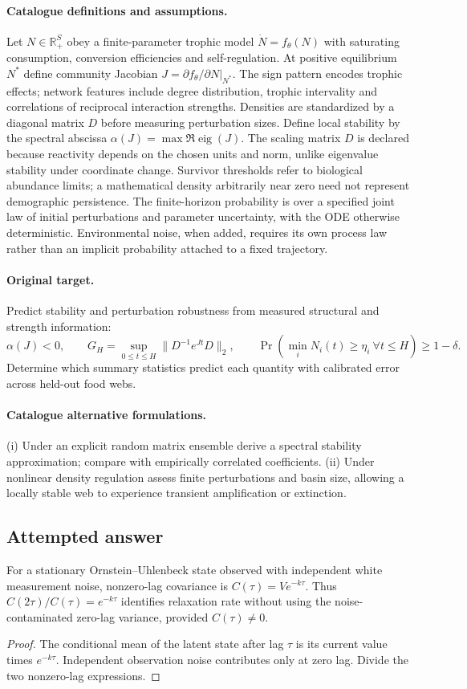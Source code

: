 \documentclass[11pt]{article}
\begin{document}
\paragraph{Catalogue definitions and assumptions.}
Let $N\in\mathbb{R}_+^S$ obey a finite-parameter trophic model $\dot N=f_\theta(N)$ with saturating consumption, conversion efficiencies and self-regulation. At positive equilibrium $N^*$ define community Jacobian $J=\partial f_\theta/\partial N|_{N^*}$. The sign pattern encodes trophic effects; network features include degree distribution, trophic intervality and correlations of reciprocal interaction strengths. Densities are standardized by a diagonal matrix $D$ before measuring perturbation sizes. Define local stability by the spectral abscissa $\alpha(J)=\max\Re\operatorname{eig}(J)$. The scaling matrix $D$ is declared because reactivity depends on the chosen units and norm, unlike eigenvalue stability under coordinate change. Survivor thresholds refer to biological abundance limits; a mathematical density arbitrarily near zero need not represent demographic persistence. The finite-horizon probability is over a specified joint law of initial perturbations and parameter uncertainty, with the ODE otherwise deterministic. Environmental noise, when added, requires its own process law rather than an implicit probability attached to a fixed trajectory.
\paragraph{Original target.}
Predict stability and perturbation robustness from measured structural and strength information:
\[
 \alpha(J)<0,\qquad
 G_H=\sup_{0\le t\le H}\|D^{-1}e^{Jt}D\|_2,
 \qquad \Pr(\min_iN_i(t)\ge\eta_i\ \forall t\le H)\ge1-\delta.
\]
Determine which summary statistics predict each quantity with calibrated error across held-out food webs.
\paragraph{Catalogue alternative formulations.}
(i) Under an explicit random matrix ensemble derive a spectral stability approximation; compare with empirically correlated coefficients. (ii) Under nonlinear density regulation assess finite perturbations and basin size, allowing a locally stable web to experience transient amplification or extinction.
\subsection{Attempted answer}
\begin{proposition}
For a stationary Ornstein--Uhlenbeck state observed with independent white measurement noise, nonzero-lag covariance is $C(\tau)=Ve^{-k\tau}$. Thus $C(2\tau)/C(\tau)=e^{-k\tau}$ identifies relaxation rate without using the noise-contaminated zero-lag variance, provided $C(\tau)\ne0$.
\end{proposition}
\begin{proof}
The conditional mean of the latent state after lag $\tau$ is its current value times $e^{-k\tau}$. Independent observation noise contributes only at zero lag. Divide the two nonzero-lag expressions.
\end{proof}
\end{document}
